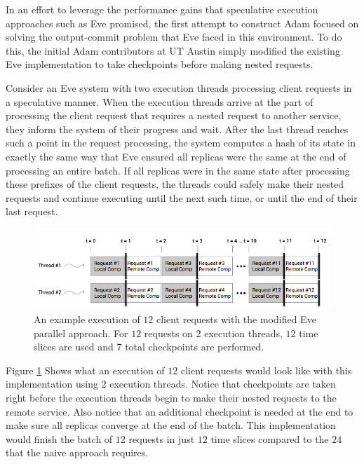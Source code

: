 \documentclass[11pt, oneside]{report}
\begin{document}
In an effort to leverage the performance gains that speculative execution approaches such as Eve promised, the first attempt to construct Adam focused on solving the output-commit problem that Eve faced in this environment. 
To do this, the initial Adam contributors at UT Austin simply modified the existing Eve implementation to take checkpoints before making nested requests. 

Consider an Eve system with two execution threads processing client requests in a speculative manner. 
When the execution threads arrive at the part of processing the client request that requires a nested request to another service, they inform the system of their progress and wait. 
After the last thread reaches such a point in the request processing, the system computes a hash of its state in exactly the same way that Eve ensured all replicas were the same at the end of processing an entire batch. 
If all replicas were in the same state after processing these prefixes of the client requests, the threads could safely make their nested requests and continue executing until the next such time, or until the end of their last request.

\begin{figure}[h]
\centering
\includegraphics[width=1.0\textwidth]{Parallel.png}
\caption{\label{parallel}An example execution of $12$ client requests with the modified Eve parallel approach. For $12$ requests on $2$ execution threads, $12$ time slices are used and $7$ total checkpoints are performed.}
\end{figure}

Figure \ref{parallel} Shows what an execution of $12$ client requests would look like with this implementation using $2$ execution threads. 
Notice that checkpoints are taken right before the execution threads begin to make their nested requests to the remote service. 
Also notice that an additional checkpoint is needed at the end to make sure all replicas converge at the end of the batch.
This implementation would finish the batch of $12$ requests in just $12$ time slices compared to the $24$ that the naive approach requires.
\end{document}
